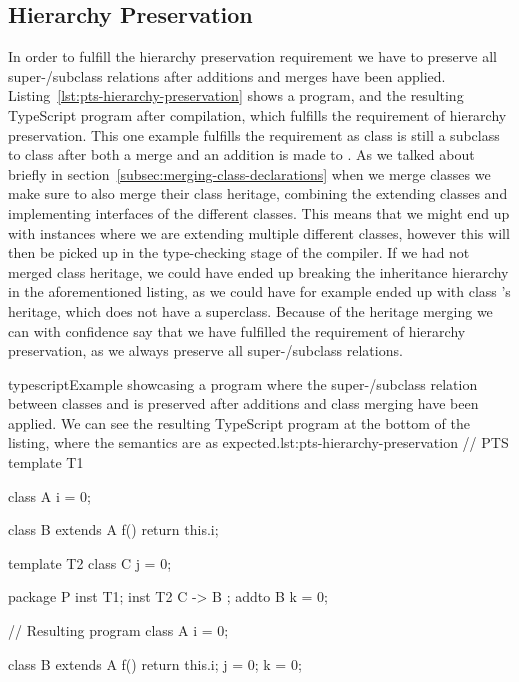 \subsection{Hierarchy Preservation}\label{subsec:pts-hierarchy-preservation}

In order to fulfill the hierarchy preservation requirement we have to preserve all super-/subclass relations after additions and merges have been applied.
Listing~\vref{lst:pts-hierarchy-preservation} shows a program, and the resulting TypeScript program after compilation, which fulfills the requirement of hierarchy preservation.
This one example fulfills the requirement as class  is still a subclass to class  after both a merge and an addition is made to .
As we talked about briefly in section~\vref{subsec:merging-class-declarations} when we merge classes we make sure to also merge their class heritage, combining the extending classes and implementing interfaces of the different classes.
This means that we might end up with instances where we are extending multiple different classes, however this will then be picked up in the type-checking stage of the compiler.
If we had not merged class heritage, we could have ended up breaking the inheritance hierarchy in the aforementioned listing, as we could have for example ended up with class 's heritage, which does not have a superclass.
Because of the heritage merging we can with confidence say that we have fulfilled the requirement of hierarchy preservation, as we always preserve all super-/subclass relations.

\begin{code}{typescript}{Example showcasing a program where the super-/subclass relation between classes  and  is preserved after additions and class merging have been applied. We can see the resulting TypeScript program at the bottom of the listing, where the semantics are as expected.}{lst:pts-hierarchy-preservation}
    // PTS
    template T1 {
        class A {
            i = 0;
        }

        class B extends A {
            f() {
                return this.i;
            }
        }
    }

    template T2 {
        class C {
            j = 0;
        }
    }

    package P {
        inst T1;
        inst T2 { C -> B };
        addto B {
            k = 0;
        }
    }

    // Resulting program
    class A {
        i = 0;
    }

    class B extends A {
        f() {
            return this.i;
        }
        j = 0;
        k = 0;
    }
\end{code}


